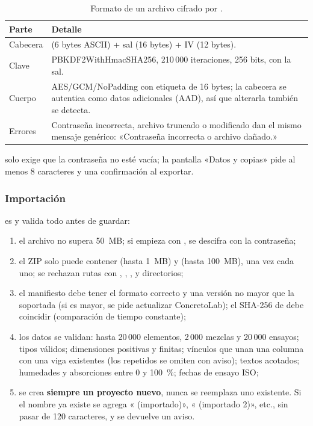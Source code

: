 \begin{table}[H]
	\centering
	\caption{Formato de un archivo cifrado por .}
	\label{tab:bd-cifrado}
	\begin{tabular}{L{4.4cm}L{9.4cm}}
		\hline
		\textbf{Parte} & \textbf{Detalle} \\ \hline
		Cabecera &  (6 bytes ASCII) + sal (16 bytes) + IV (12 bytes). \\
		Clave & PBKDF2WithHmacSHA256, 210\,000 iteraciones, 256 bits, con la sal. \\
		Cuerpo & AES/GCM/NoPadding con etiqueta de 16 bytes; la cabecera se autentica como datos adicionales (AAD), así
		que alterarla también se detecta. \\
		Errores & Contraseña incorrecta, archivo truncado o modificado dan el mismo mensaje genérico: «Contraseña
		incorrecta o archivo dañado.» \\ \hline
	\end{tabular}
\end{table}

 solo exige que la contraseña no esté vacía; la pantalla «Datos y copias» pide al menos 8
caracteres y una confirmación al exportar.

\subsubsection{Importación}

 es  y valida todo antes de guardar:

\begin{enumerate}
	\item el archivo no supera 50~MB; si empieza con , se descifra con la contraseña;
	\item el ZIP solo puede contener  (hasta 1~MB) y  (hasta 100~MB), una vez cada
	      uno; se rechazan rutas con , \ruta{/}, \ruta{\textbackslash}, \ruta{:} y directorios;
	\item el manifiesto debe tener el formato correcto y una versión no mayor que la soportada (si es mayor, se pide
	      actualizar ConcretoLab); el SHA-256 de  debe coincidir (comparación de tiempo constante);
	\item los datos se validan: hasta 20\,000 elementos, 2\,000 mezclas y 20\,000 ensayos; tipos válidos; dimensiones
	      positivas y finitas; vínculos que unan una columna con una viga existentes (los repetidos se omiten con aviso);
	      textos acotados; humedades y absorciones entre 0 y 100~\%; fechas de ensayo ISO;
	\item se crea \textbf{siempre un proyecto nuevo}, nunca se reemplaza uno existente. Si el nombre ya existe se agrega
	      « (importado)», « (importado 2)», etc., sin pasar de 120 caracteres, y se devuelve un aviso.
\end{enumerate}

